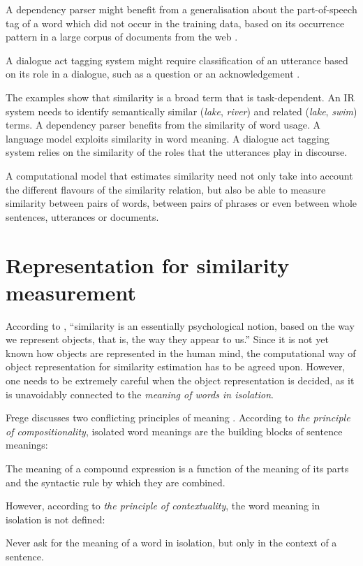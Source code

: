 A dependency parser might benefit from a generalisation about the part-of-speech tag of a word which did not occur in the training data, based on its occurrence pattern in a large corpus of documents from the web \cite{hermann-blunsom:2013:ACL2013,andreas-klein:2014:P14-2}.

A dialogue act tagging system might require classification of an utterance based on its role in a dialogue, such as a question or an acknowledgement \cite{kalchbrenner-blunsom:2013:CVSC}.

The examples show that similarity is a broad term that is task-dependent. An IR system needs to identify semantically similar (\textit{lake}, \textit{river}) and related (\textit{lake}, \textit{swim}) terms. A dependency parser benefits from the similarity of word usage. A language model exploits similarity in word meaning. A dialogue act tagging system relies on the similarity of the roles that the utterances play in discourse.

A computational model that estimates similarity need not only take into account the different flavours of the similarity relation, but also be able to measure similarity between pairs of words, between pairs of phrases or even between whole sentences, utterances or documents.

\section{Representation for similarity measurement}
\label{sec:word-meaning}

According to , ``similarity is an essentially psychological notion, based on the way we represent objects, that is, the way they appear to us.'' Since it is not yet known how objects are represented in the human mind, the computational way of object representation for similarity estimation has to be agreed upon. However, one needs to be extremely careful when the object representation is decided, as it is unavoidably connected to the \emph{meaning of words in isolation}.


Frege discusses two conflicting principles of meaning \cite{Janssen2001}. According to \emph{the principle of compositionality}, isolated word meanings are the building blocks of sentence meanings:
\begin{displayquote}
The meaning of a compound expression is a function of the meaning of its parts and the syntactic rule by which they are combined.
\end{displayquote}
%
However, according to \emph{the principle of contextuality}, the word meaning in isolation is not defined:
\begin{displayquote}
Never ask for the meaning of a word in isolation, but only in the context of a sentence.
\end{displayquote}

